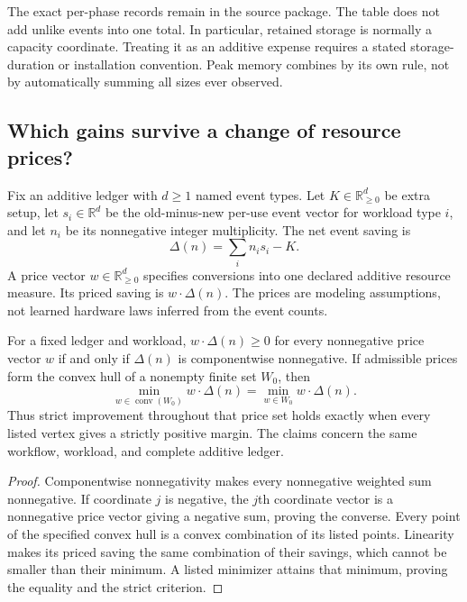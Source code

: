 The exact per-phase records remain in the source package. The table does not add unlike events into one total. In particular, retained storage is normally a capacity coordinate. Treating it as an additive expense requires a stated storage-duration or installation convention. Peak memory combines by its own rule, not by automatically summing all sizes ever observed.

\subsection{Which gains survive a change of resource prices?}
Fix an additive ledger with $d\ge1$ named event types. Let $K\in\mathbb R_{\ge0}^d$ be extra setup, let $s_i\in\mathbb R^d$ be the old-minus-new per-use event vector for workload type $i$, and let $n_i$ be its nonnegative integer multiplicity. The net event saving is
\begin{equation}\label{SII:eq:vector-saving}
 \Delta(n)=\sum_i n_i s_i-K.
\end{equation}
A price vector $w\in\mathbb R_{\ge0}^d$ specifies conversions into one declared additive resource measure. Its priced saving is $w\cdot\Delta(n)$. The prices are modeling assumptions, not learned hardware laws inferred from the event counts.

\begin{SIIproposition}\label{SII:prop:resource-prices}
For a fixed ledger and workload, $w\cdot\Delta(n)\ge0$ for every nonnegative price vector $w$ if and only if $\Delta(n)$ is componentwise nonnegative. If admissible prices form the convex hull of a nonempty finite set $W_0$, then
\[
 \min_{w\in\operatorname{conv}(W_0)}w\cdot\Delta(n)
 =\min_{w\in W_0}w\cdot\Delta(n).
\]
Thus strict improvement throughout that price set holds exactly when every listed vertex gives a strictly positive margin. The claims concern the same workflow, workload, and complete additive ledger.
\end{SIIproposition}
\begin{proof}
Componentwise nonnegativity makes every nonnegative weighted sum nonnegative. If coordinate $j$ is negative, the $j$th coordinate vector is a nonnegative price vector giving a negative sum, proving the converse. Every point of the specified convex hull is a convex combination of its listed points. Linearity makes its priced saving the same combination of their savings, which cannot be smaller than their minimum. A listed minimizer attains that minimum, proving the equality and the strict criterion.
\end{proof}

